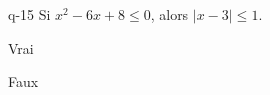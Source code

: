 \begin{truefalse}{q-15}
Si $x^2-6x+8\leq 0$, alors $|x-3|\leq 1$.
\item* Vrai
\item Faux
\end{truefalse}

